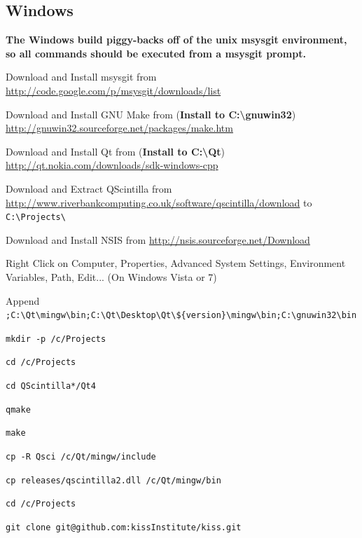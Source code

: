 \documentclass[7pt,letterpaper]{article}
\newcommand{\code}[1]{\texttt{#1}}
\newcounter{counter}
\begin{document}
	\subsection{Windows}
	\textbf{The Windows build piggy-backs off of the unix msysgit environment, so all commands should be executed from a msysgit prompt.}
	\begin{list}{Step :~}{}{}
	\item Download and Install msysgit from \newline
	\url{http://code.google.com/p/msysgit/downloads/list}
	\item Download and Install GNU Make from (\textbf{Install to C:\textbackslash gnuwin32}) \newline
	\url{http://gnuwin32.sourceforge.net/packages/make.htm} 
	\item Download and Install Qt from (\textbf{Install to C:\textbackslash Qt}) \newline
	\url{http://qt.nokia.com/downloads/sdk-windows-cpp}
	\item Download and Extract QScintilla from \newline
	\url{http://www.riverbankcomputing.co.uk/software/qscintilla/download} to \code{C:\textbackslash Projects\textbackslash}
	\item Download and Install NSIS from \newline
	\url{http://nsis.sourceforge.net/Download}
	\item Right Click on Computer, Properties, Advanced System Settings, Environment Variables, Path, Edit... (On Windows Vista or 7)
	\item Append \code{;C:\textbackslash Qt\textbackslash mingw\textbackslash bin;C:\textbackslash Qt\textbackslash Desktop\textbackslash Qt\textbackslash \$\{version\}\textbackslash mingw\textbackslash bin;C:\textbackslash gnuwin32\textbackslash bin}
	\item \code{mkdir -p /c/Projects}
	\item \code{cd /c/Projects}
	\item \code{cd QScintilla*/Qt4}
	\item \code{qmake}
	\item \code{make}
	\item \code{cp -R Qsci /c/Qt/mingw/include}
	\item \code{cp releases/qscintilla2.dll /c/Qt/mingw/bin}
	\item \code{cd /c/Projects}
	\item \code{git clone git@github.com:kissInstitute/kiss.git}

\end{list}
\end{document}
